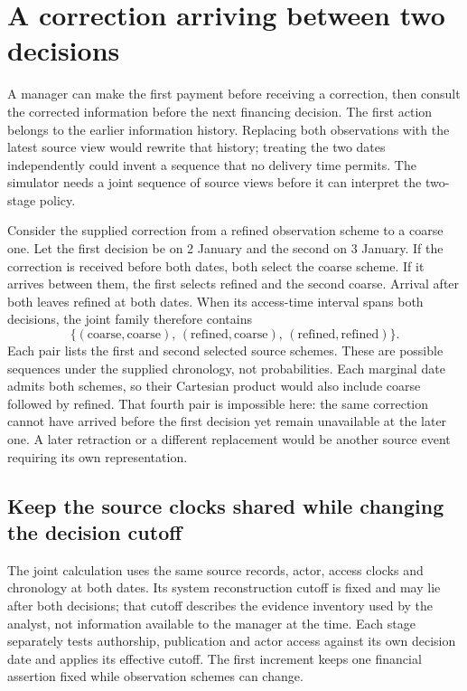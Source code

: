 \section{A correction arriving between two decisions}
\label{sim:joint-stage-source-policy}

A manager can make the first payment before receiving a correction, then consult the corrected information before the next financing decision. The first action belongs to the earlier information history. Replacing both observations with the latest source view would rewrite that history; treating the two dates independently could invent a sequence that no delivery time permits. The simulator needs a joint sequence of source views before it can interpret the two-stage policy.

Consider the supplied correction from a refined observation scheme to a coarse one. Let the first decision be on 2 January and the second on 3 January. If the correction is received before both dates, both select the coarse scheme. If it arrives between them, the first selects refined and the second coarse. Arrival after both leaves refined at both dates. When its access-time interval spans both decisions, the joint family therefore contains
\begin{equation}
 \{(\mathrm{coarse},\mathrm{coarse}),\,
   (\mathrm{refined},\mathrm{coarse}),\,
   (\mathrm{refined},\mathrm{refined})\}.
 \label{eq:joint-source-view-pairs}
\end{equation}
Each pair lists the first and second selected source schemes. These are possible sequences under the supplied chronology, not probabilities. Each marginal date admits both schemes, so their Cartesian product would also include coarse followed by refined. That fourth pair is impossible here: the same correction cannot have arrived before the first decision yet remain unavailable at the later one. A later retraction or a different replacement would be another source event requiring its own representation.

\subsection{Keep the source clocks shared while changing the decision cutoff}

The joint calculation uses the same source records, actor, access clocks and chronology at both dates. Its system reconstruction cutoff is fixed and may lie after both decisions; that cutoff describes the evidence inventory used by the analyst, not information available to the manager at the time. Each stage separately tests authorship, publication and actor access against its own decision date and applies its effective cutoff. The first increment keeps one financial assertion fixed while observation schemes can change.

